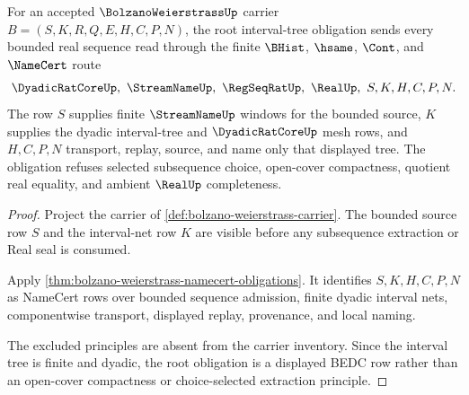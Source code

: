 \begin{theorem}
\label{thm:bolzano-weierstrass-root-interval-tree-obligation}
For an accepted $\BolzanoWeierstrassUp$ carrier $B=(S,K,R,Q,E,H,C,P,N)$, the root interval-tree obligation sends every bounded real sequence read through the finite $\BHist$, $\hsame$, $\Cont$, and $\NameCert$ route
$$
\DyadicRatCoreUp,\ \StreamNameUp,\ \RegSeqRatUp,\ \RealUp,\ S,K,H,C,P,N .
$$
The row $S$ supplies finite $\StreamNameUp$ windows for the bounded source, $K$ supplies the dyadic interval-tree and $\DyadicRatCoreUp$ mesh rows, and $H,C,P,N$ transport, replay, source, and name only that displayed tree. The obligation refuses selected subsequence choice, open-cover compactness, quotient real equality, and ambient $\RealUp$ completeness.
\end{theorem}
\begin{proof}
Project the carrier of \autoref{def:bolzano-weierstrass-carrier}. The bounded source row $S$ and the interval-net row $K$ are visible before any subsequence extraction or Real seal is consumed.

Apply \autoref{thm:bolzano-weierstrass-namecert-obligations}. It identifies $S,K,H,C,P,N$ as NameCert rows over bounded sequence admission, finite dyadic interval nets, componentwise transport, displayed replay, provenance, and local naming.

The excluded principles are absent from the carrier inventory. Since the interval tree is finite and dyadic, the root obligation is a displayed BEDC row rather than an open-cover compactness or choice-selected extraction principle.
\end{proof}

